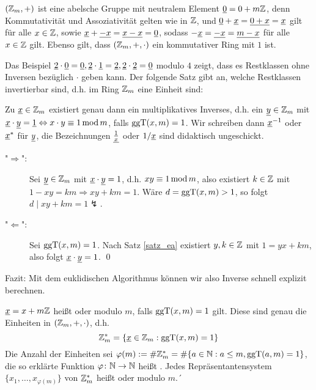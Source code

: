 \begin{folg}
	$(\mathbb{Z}_m,+)$ ist eine abelsche Gruppe mit neutralem Element $\uline{0} = 0 + m\ZZ$, denn Kommutativität und Assoziativität gelten wie in $\mathbb{Z}$, und $\uline{0} + \uline{x} = \uline{0+x} = \uline{x}$ gilt für alle $x \in \mathbb{Z}$, sowie $\uline{x} + \uline{-x} = \uline{x-x} = \uline{0}$, sodass $-\uline{x} = \uline{-x} = \uline{m-x}$ für alle $x \in \mathbb{Z}$ gilt. 
	Ebenso gilt, dass $(\mathbb{Z}_m,+,\cdot)$ ein kommutativer Ring mit $1$ ist.
\end{folg}

Das Beispiel $\uline{2} \cdot \uline{0} = \uline{0}, \uline{2} \cdot \uline{1} = \uline{2}, \uline{2} \cdot \uline{2} = \uline{0}$ modulo $4$ zeigt, dass es Restklassen ohne Inversen bezüglich $\cdot$ geben kann. 
Der folgende Satz gibt an, welche Restklassen invertierbar sind, d.h. im Ring $\ZZ_m$ eine Einheit sind:

\begin{satz}[Einheiten in $\ZZ_m$]
	Zu $\uline{x} \in \ZZ_m$ existiert genau dann ein multiplikatives Inverses, d.h. ein $\uline{y} \in \ZZ_m$ mit $\uline{x} \cdot \uline{y} = \uline{1} \Leftrightarrow x \cdot y \kon 1 \modu m$, falls $\operatorname{ggT}(x,m) = 1$. 
	Wir schreiben dann $\uline{x}^{-1}$ oder $\uline{x}^*$ für $\uline{y}$, die Bezeichnungen $\uline{\frac{1}{x}}$ oder $1/\uline{x}$ sind didaktisch ungeschickt.
\end{satz}

	\begin{description}
		\item["$\Rightarrow$":] Sei $\uline{y} \in \ZZ_m$ mit $\uline{x} \cdot \uline{y} = 1$, d.h. $xy \equiv 1 \operatorname{mod} m$, also existiert $k \in \mathbb{Z}$ mit $1 - xy = km \Rightarrow xy + km = 1$. 
		Wäre $d = \operatorname{ggT}(x,m) > 1$, so folgt $d \mid xy + km = 1 \lightning$.
		\item["$\Leftarrow$":] Sei $\operatorname{ggT}(x,m) = 1$. 
		Nach Satz \ref{satz_ea} existiert $y,k \in \mathbb{Z}$ mit $1 = yx + km$, also folgt $\uline{x} \cdot \uline{y} = 1$. \qed
	\end{description}

Fazit: Mit dem euklidischen Algorithmus können wir also Inverse schnell explizit berechnen.

\begin{defn}
	$\uline{x} = x + m\ZZ$ heißt  oder  modulo $m$, falls $\operatorname{ggT}(x,m) = 1$ gilt. 
	Diese sind genau die Einheiten in $(\mathbb{Z}_m,+,\cdot)$, d.h.
	\[ \ZZ_m^* = \{\uline{x} \in \ZZ_m : \ggT(x,m) = 1\} \]
	Die Anzahl der Einheiten sei $\varphi(m) := \# \mathbb{Z}_m^* = \# \{a \in \mathbb{N} : a \leq m, \operatorname{ggT}(a,m) = 1\}$, die so erklärte Funktion $\varphi\colon \mathbb{N} \rightarrow \mathbb{N}$ heißt . 
	Jedes Repräsentantensystem $\{x_1, \dots, x_{\varphi(m)}\}$ von $\mathbb{Z}_m^*$ heißt  oder  modulo $m$.´ 
\end{defn}

